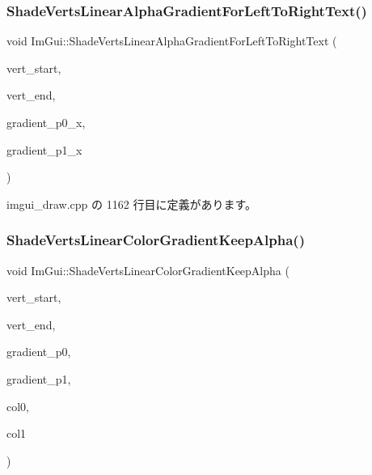 \subsubsection{\texorpdfstring{Shade\+Verts\+Linear\+Alpha\+Gradient\+For\+Left\+To\+Right\+Text()}{ShadeVertsLinearAlphaGradientForLeftToRightText()}}
{\footnotesize\ttfamily void Im\+Gui\+::\+Shade\+Verts\+Linear\+Alpha\+Gradient\+For\+Left\+To\+Right\+Text (\begin{DoxyParamCaption}\item[{\mbox{\hyperlink{struct_im_draw_vert}{Im\+Draw\+Vert}} $\ast$}]{vert\+\_\+start,  }\item[{\mbox{\hyperlink{struct_im_draw_vert}{Im\+Draw\+Vert}} $\ast$}]{vert\+\_\+end,  }\item[{float}]{gradient\+\_\+p0\+\_\+x,  }\item[{float}]{gradient\+\_\+p1\+\_\+x }\end{DoxyParamCaption})}



 imgui\+\_\+draw.\+cpp の 1162 行目に定義があります。

\mbox{\label{namespace_im_gui_a7880876c5072e610be8f8e898d2a8866}} 
\subsubsection{\texorpdfstring{Shade\+Verts\+Linear\+Color\+Gradient\+Keep\+Alpha()}{ShadeVertsLinearColorGradientKeepAlpha()}}
{\footnotesize\ttfamily void Im\+Gui\+::\+Shade\+Verts\+Linear\+Color\+Gradient\+Keep\+Alpha (\begin{DoxyParamCaption}\item[{\mbox{\hyperlink{struct_im_draw_vert}{Im\+Draw\+Vert}} $\ast$}]{vert\+\_\+start,  }\item[{\mbox{\hyperlink{struct_im_draw_vert}{Im\+Draw\+Vert}} $\ast$}]{vert\+\_\+end,  }\item[{\mbox{\hyperlink{struct_im_vec2}{Im\+Vec2}}}]{gradient\+\_\+p0,  }\item[{\mbox{\hyperlink{struct_im_vec2}{Im\+Vec2}}}]{gradient\+\_\+p1,  }\item[{\mbox{\hyperlink{imgui_8h_a118cff4eeb8d00e7d07ce3d6460eed36}{Im\+U32}}}]{col0,  }\item[{\mbox{\hyperlink{imgui_8h_a118cff4eeb8d00e7d07ce3d6460eed36}{Im\+U32}}}]{col1 }\end{DoxyParamCaption})}



